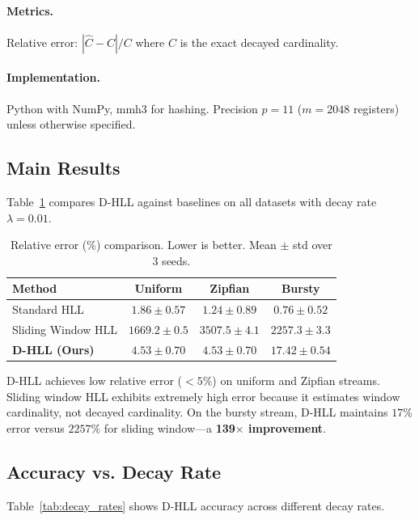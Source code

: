 \documentclass{article}
\begin{document}
\paragraph{Metrics.}
Relative error: $|\hat{C} - C| / C$ where $C$ is the exact decayed cardinality.

\paragraph{Implementation.}
Python with NumPy, mmh3 for hashing. Precision $p=11$ ($m=2048$ registers) unless otherwise specified.

\subsection{Main Results}

Table~\ref{tab:main_results} compares D-HLL against baselines on all datasets with decay rate $\lambda=0.01$.

\begin{table}[t]
\caption{Relative error (\%) comparison. Lower is better. Mean $\pm$ std over 3 seeds.}
\label{tab:main_results}
\centering
\begin{tabular}{lccc}
\toprule
Method & Uniform & Zipfian & Bursty \\
\midrule
Standard HLL & $1.86 \pm 0.57$ & $1.24 \pm 0.89$ & $0.76 \pm 0.52$ \\
Sliding Window HLL & $1669.2 \pm 0.5$ & $3507.5 \pm 4.1$ & $2257.3 \pm 3.3$ \\
\textbf{D-HLL (Ours)} & $\mathbf{4.53 \pm 0.70}$ & $\mathbf{4.53 \pm 0.70}$ & $\mathbf{17.42 \pm 0.54}$ \\
\bottomrule
\end{tabular}
\end{table}

D-HLL achieves low relative error ($<5\%$) on uniform and Zipfian streams. Sliding window HLL exhibits extremely high error because it estimates window cardinality, not decayed cardinality. On the bursty stream, D-HLL maintains $17\%$ error versus $2257\%$ for sliding window---a \textbf{139$\times$ improvement}.

\subsection{Accuracy vs. Decay Rate}

Table~\ref{tab:decay_rates} shows D-HLL accuracy across different decay rates.
\end{document}
